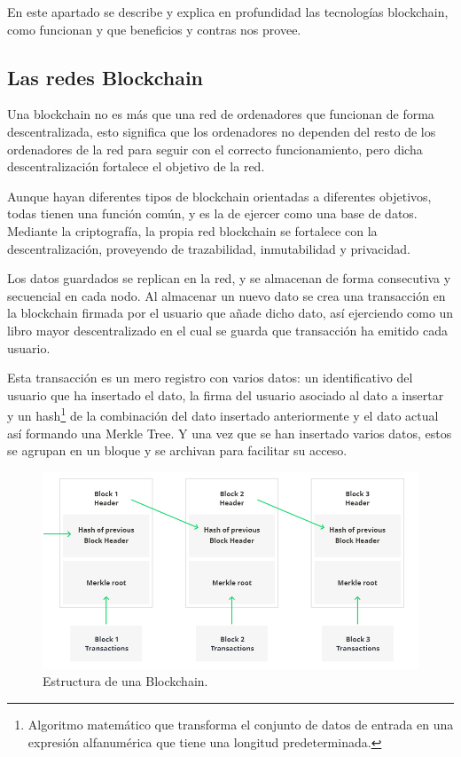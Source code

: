 En este apartado se describe y explica en profundidad las tecnologías blockchain, como funcionan y que beneficios y contras nos provee.

\subsection{Las redes Blockchain}

Una blockchain\cite{di2017blockchain} no es más que una red de ordenadores que funcionan de forma descentralizada, esto significa que los ordenadores no dependen del resto de los ordenadores de la red para seguir con el correcto funcionamiento, pero dicha descentralización fortalece el objetivo de la red.

\bigskip

Aunque hayan diferentes tipos de blockchain orientadas a diferentes objetivos, todas tienen una función común, y es la de ejercer como una base de datos. Mediante la criptografía, la propia red blockchain se fortalece con la descentralización, proveyendo de trazabilidad, inmutabilidad y privacidad.

\bigskip

Los datos guardados se replican en la red, y se almacenan de forma consecutiva y secuencial en cada nodo. Al almacenar un nuevo dato se crea una transacción en la blockchain firmada por el usuario que añade dicho dato, así ejerciendo como un libro mayor descentralizado en el cual se guarda que transacción ha emitido cada usuario.

\bigskip

Esta transacción es un mero registro con varios datos: un identificativo del usuario que ha insertado el dato, la firma del usuario asociado al dato a insertar y un hash\footnote{Algoritmo matemático que transforma el conjunto de datos de entrada en una expresión alfanumérica que tiene una longitud predeterminada.} de la combinación del dato insertado anteriormente y el dato actual así formando una Merkle Tree\cite{merkeltree}. Y una vez que se han insertado varios datos, estos se agrupan en un bloque y se archivan para facilitar su acceso.


\begin{figure}[H]
        \centering
        \includegraphics[width=1\textwidth]{img/capturas/blockchain.png}
        \caption{Estructura de una Blockchain.}
        \label{fig:configApi}
\end{figure}


